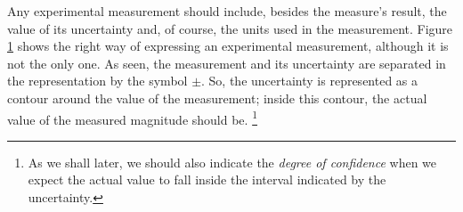 \begin{paracol}{2}
Any experimental measurement should include, besides the measure's result, the value of its uncertainty and, of course, the units used in the measurement. Figure \ref{fig:incertidumbre} shows the right way of expressing an experimental measurement, although it is not the only one. As seen, the measurement and its uncertainty are separated in the representation by the symbol $\pm$. So, the uncertainty is represented as a contour around the value of the measurement; inside this contour, the actual value of the measured magnitude should be. \footnote{As we shall later, we should also indicate the \emph{degree of confidence} when we expect the actual value to fall inside the interval indicated by the uncertainty.}
\end{paracol}

\begin{figure}
\centering
{}
\label{fig:incertidumbre}
\end{figure} 

